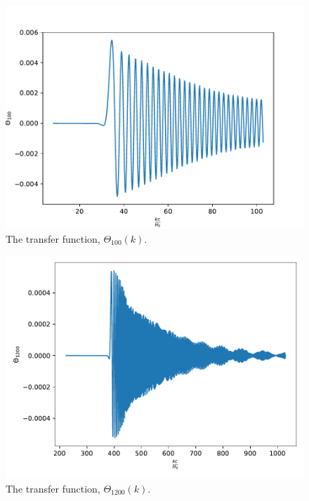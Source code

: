 \documentclass{aa}
\begin{document}
\begin{figure}[H]
   \includegraphics[scale=0.6]{../figures/milestone4/theta_100.pdf}
   \caption{The transfer function, $\Theta_{100}(k)$.}\label{fig:m4_theta100}
\end{figure}

\begin{figure}[H]
   \includegraphics[scale=0.6]{../figures/milestone4/theta_1200.pdf}
   \caption{The transfer function, $\Theta_{1200}(k)$.}\label{fig:m4_theta1200}
\end{figure}
\end{document}
